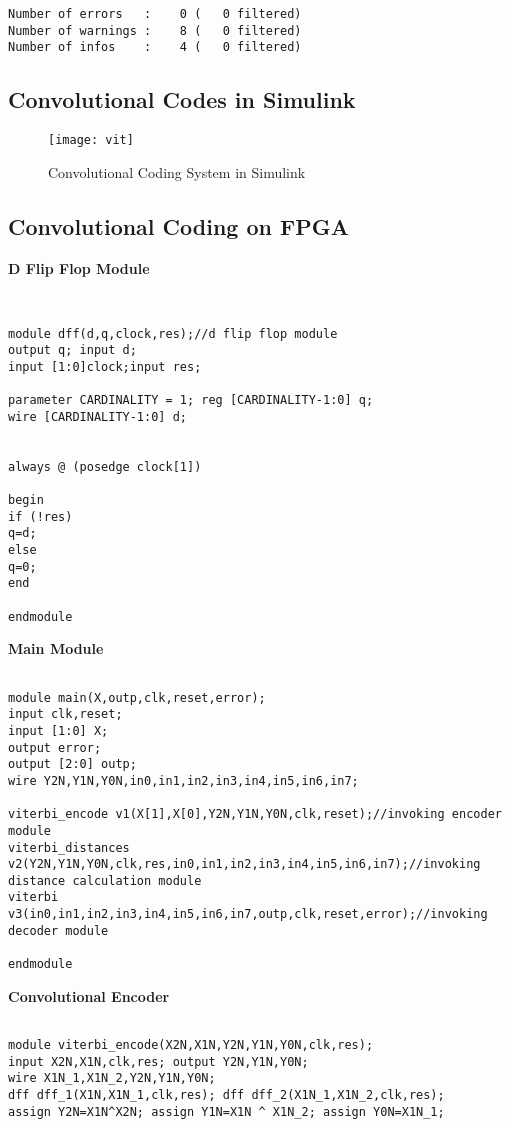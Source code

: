 \documentclass[14pt]{report}
\begin{document}
{\begin{verbatim}
Number of errors   :    0 (   0 filtered)
Number of warnings :    8 (   0 filtered)
Number of infos    :    4 (   0 filtered)
\end{verbatim}
\subsection{Convolutional Codes in Simulink}
\begin{figure}[ht]
\centering
\texttt{[image: vit]}
\caption{Convolutional Coding System in Simulink}
\end{figure}

\subsection{Convolutional Coding on FPGA}
\textbf{D Flip Flop Module}\\
\begin{verbatim}


module dff(d,q,clock,res);//d flip flop module
output q; input d;
input [1:0]clock;input res;
 
parameter CARDINALITY = 1; reg [CARDINALITY-1:0] q;
wire [CARDINALITY-1:0] d;
 

always @ (posedge clock[1])

begin
if (!res)
q=d;
else
q=0;
end

endmodule
\end{verbatim}
\textbf{Main Module}\\
\begin{verbatim}

module main(X,outp,clk,reset,error);
input clk,reset;
input [1:0] X;
output error;
output [2:0] outp;
wire Y2N,Y1N,Y0N,in0,in1,in2,in3,in4,in5,in6,in7;

viterbi_encode v1(X[1],X[0],Y2N,Y1N,Y0N,clk,reset);//invoking encoder module
viterbi_distances v2(Y2N,Y1N,Y0N,clk,res,in0,in1,in2,in3,in4,in5,in6,in7);//invoking distance calculation module
viterbi v3(in0,in1,in2,in3,in4,in5,in6,in7,outp,clk,reset,error);//invoking decoder module

endmodule

\end{verbatim}
\textbf{Convolutional Encoder}\\
\begin{verbatim}

module viterbi_encode(X2N,X1N,Y2N,Y1N,Y0N,clk,res);
input X2N,X1N,clk,res; output Y2N,Y1N,Y0N;
wire X1N_1,X1N_2,Y2N,Y1N,Y0N;
dff dff_1(X1N,X1N_1,clk,res); dff dff_2(X1N_1,X1N_2,clk,res);
assign Y2N=X1N^X2N; assign Y1N=X1N ^ X1N_2; assign Y0N=X1N_1; 


\end{verbatim}}
\end{document}
